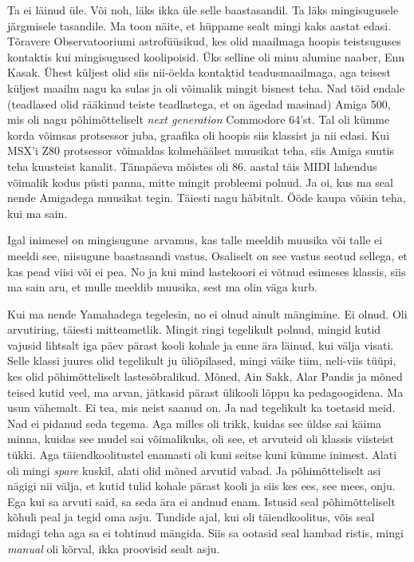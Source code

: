 Ta ei läinud üle. Või noh, läks ikka üle selle baastasandil. Ta läks 
mingisugusele järgmisele tasandile. Ma toon näite, et hüppame sealt mingi kaks 
aastat edasi. Tõravere Observatooriumi 
astrofüüsikud, kes olid maailmaga  hoopis teistsuguses kontaktis kui 
mingisugused koolipoisid. Üks selline oli minu alumine naaber,  Enn 
Kasak. Ühest küljest olid siis nii-öelda kontaktid 
teadusmaailmaga, aga teisest küljest maailm nagu ka sulas ja oli 
võimalik mingit bisnest teha. Nad  tõid endale (teadlased olid 
rääkinud teiste teadlastega, et on ägedad masinad) Amiga 
500,  mis oli nagu 
põhimõtteliselt \emph{next generation}  Commodore 64'st. Tal oli kümme 
korda võimsas protsessor juba,  graafika oli hoopis siis klassist ja nii edasi. 
Kui MSX'i Z80 protsessor  võimaldas  kolmehäälset muusikat teha, siis Amiga 
suutis teha  kuusteist kanalit. Tänapäeva mõistes oli 86. aastal täis MIDI 
lahendus  võimalik kodus püsti panna, mitte mingit probleemi polnud. Ja oi, kus 
ma seal nende Amigadega muusikat tegin. Täiesti nagu häbitult. Ööde kaupa 
võisin teha, kui ma sain.


Igal inimesel on mingisugune arvamus, kas talle  meeldib muusika või talle ei 
meeldi see, niisugune baastasandi vastus. Osaliselt on see vastus seotud sellega, et 
kas pead viisi või ei pea. No ja kui mind lastekoori ei võtnud esimeses 
klassis, siis ma sain aru, et mulle meeldib muusika, sest ma olin väga kurb. 

Kui ma nende Yamahadega tegelesin, no ei olnud ainult mängimine. Ei olnud. 
Oli arvutiring, täiesti mitteametlik. Mingit ringi tegelikult polnud, mingid 
kutid vajusid lihtsalt iga päev pärast kooli kohale ja enne ära läinud, kui välja 
visati. Selle klassi juures olid tegelikult ju   
üliõpilased, mingi väike tiim, neli-viis tüüpi, kes  olid põhimõtteliselt 
lastesõbralikud. Mõned, Ain Sakk, Alar Pandis ja mõned teised kutid  
veel, ma arvan, jätkasid pärast ülikooli lõppu ka pedagoogidena. Ma usun 
vähemalt. Ei tea, mis neist saanud on. Ja nad tegelikult ka toetasid meid. Nad ei pidanud 
seda tegema. Aga milles oli trikk, kuidas see üldse sai käima minna, kuidas see 
mudel sai võimalikuks, oli see, et arvuteid oli klassis viisteist tükki. Aga 
täiendkoolitustel enamasti oli kuni seitse kuni kümme inimest. 
Alati oli mingi \emph{spare} kuskil, alati olid mõned arvutid vabad. 
Ja põhimõtteliselt asi nägigi nii välja, et kutid tulid kohale pärast  kooli ja 
siis kes ees, see mees, onju. Ega kui sa arvuti said, sa seda ära ei 
andnud enam. Istusid seal põhimõtteliselt kõhuli peal ja tegid oma asju. 
Tundide ajal, kui oli täiendkoolitus, võis seal midagi teha aga sa ei tohtinud 
mängida. Siis sa ootasid seal hambad ristis, mingi \emph{manual} oli 
kõrval, ikka proovisid sealt asju. 


